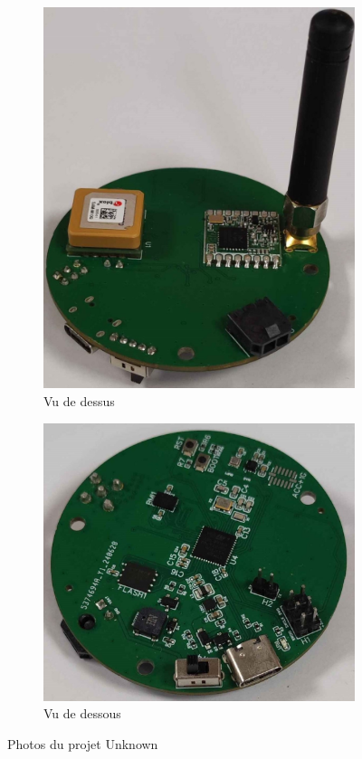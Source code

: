 \begin{figure}[h]
    \centering
    \begin{subfigure}{0.45\textwidth}
        \includegraphics[width=\textwidth]{Unknown/photo/IMG_1.jpg}
        \caption{Vu de dessus}
    \end{subfigure}
    \begin{subfigure}{0.45\textwidth}
        \includegraphics[width=\textwidth]{Unknown/photo/IMG_2.jpg}
        \caption{Vu de dessous}
    \end{subfigure}
    \caption{Photos du projet Unknown}
    \label{anx:fig:unknown}
\end{figure}
